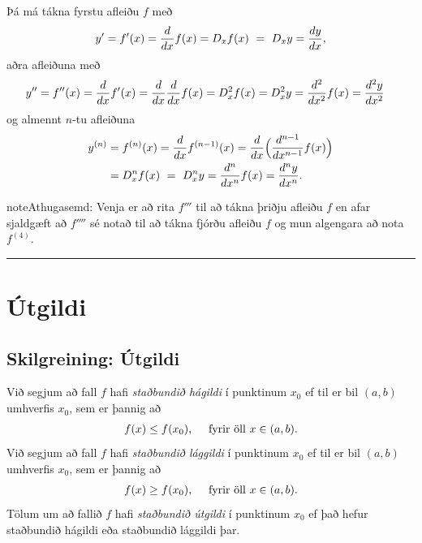 \documentclass[b5paper,10pt,icelandic]{sphinxmanual}
\begin{document}
Þá má tákna fyrstu afleiðu \(f\) með
\begin{gather}
\begin{split}y'= f'(x)=\frac{d}{dx}f(x)=D_xf(x)\ =\ D_x y= \frac{dy}{dx},\end{split}\notag
\end{gather}
aðra afleiðuna með
\begin{gather}
\begin{split}\begin{aligned}
y'' &=
f''(x)=\frac{d}{dx}f'(x)=\frac{d}{dx}\frac{d}{dx}f(x)
= D^2_xf(x)= D^2_x y=\frac{d^2}{dx^2}f(x)=\frac{d^2 y}{dx^2}\end{aligned}\end{split}\notag
\end{gather}
og almennt \(n\)-tu afleiðuna
\begin{gather}
\begin{split}\begin{aligned}
y^{(n)} &= f^{(n)}(x)=\frac{d}{dx}f^{(n-1)}(x)=
\frac{d}{dx}\Big(\frac{d^{n-1}}{dx^{n-1}}f(x)\Big) \\
&=D^n_xf(x)\ =\ D^n_x y
=\frac{d^n}{dx^n}f(x)
= \frac{d^n y}{dx^n}.\end{aligned}\end{split}\notag
\end{gather}
\begin{notice}{note}{Athugasemd:}
Venja er að rita \(f'''\) til að tákna þriðju afleiðu \(f\) en
afar sjaldgæft að \(f''''\) sé notað til að tákna fjórðu afleiðu
\(f\) og mun algengara að nota \(f^{(4)}\).
\end{notice}


\bigskip\hrule{}\bigskip



\section{Útgildi}
\label{kafli03:id10}\label{kafli03:utgildi}

\subsection{Skilgreining: Útgildi}
\label{kafli03:skilgreining-utgildi}\label{kafli03:index-5}
Við segjum að fall \(f\) hafi \textit{staðbundið hágildi} í punktinum
\(x_0\) ef til er bil \((a,b)\) umhverfis \(x_0\), sem er
þannig að
\begin{gather}
\begin{split}f(x) \leq f(x_0), \quad \text{ fyrir öll } x \in (a,b).\end{split}\notag
\end{gather}
Við segjum að fall \(f\) hafi \textit{staðbundið lággildi} í punktinum
\(x_0\) ef til er bil \((a,b)\) umhverfis \(x_0\), sem er
þannig að
\begin{gather}
\begin{split}f(x) \geq f(x_0), \quad \text{ fyrir öll } x \in (a,b).\end{split}\notag
\end{gather}
Tölum um að fallið \(f\) hafi \textit{staðbundið útgildi} í punktinum
\(x_0\) ef það hefur staðbundið hágildi eða staðbundið lággildi þar.
\end{document}
